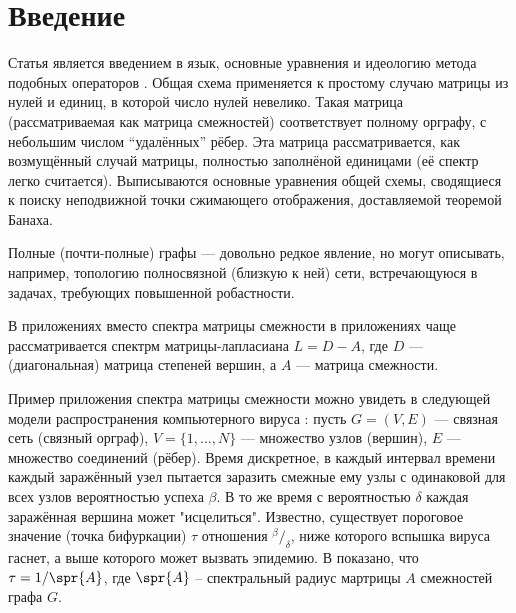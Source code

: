 \section{Введение}

Статья является введением в язык, основные уравнения и идеологию
метода подобных операторов \cite{baskakov-harmonic}.
Общая схема применяется к простому случаю матрицы из нулей и единиц,
в которой число нулей невелико.
Такая матрица (рассматриваемая как матрица смежностей)
соответствует полному орграфу, с небольшим числом ``удалённых'' рёбер.
Эта матрица рассматривается, как возмущённый случай матрицы,
полностью заполнёной единицами (её спектр легко считается).
Выписываются основные уравнения общей схемы,
сводящиеся к поиску неподвижной точки сжимающего отображения,
доставляемой теоремой Банаха.

Полные (почти-полные) графы --- довольно редкое явление,
но могут описывать, например, топологию полносвязной (близкую к ней) сети,
встречающуюся в задачах, требующих повышенной робастности.

В приложениях вместо спектра матрицы смежности в приложениях чаще рассматривается
спектрм матрицы-лапласиана \( L = D - A \),
где \( D \) --- (диагональная) матрица степеней вершин,
а \( A \) --- матрица смежности.

Пример приложения спектра матрицы смежности можно увидеть
в следующей модели распространения компьютерного вируса \cite{epidemic-eigenvalues}:
пусть \( G = (V, E) \) --- связная сеть (связный орграф),
\( V = \{1, \ldots, N\} \) --- множество узлов (вершин),
\( E \) --- множество соединений (рёбер).
Время дискретное, в каждый интервал времени каждый заражённый узел
пытается заразить смежные ему узлы с одинаковой для всех узлов вероятностью успеха \( \beta \).
В то же время с вероятностью \( \delta \) каждая заражённая вершина может "исцелиться".
Известно, существует пороговое значение (точка бифуркации) \( \tau \) отношения \( {^\beta}/_{\delta} \),
ниже которого вспышка вируса гаснет, а выше которого может вызвать эпидемию.
В \cite{epidemic-eigenvalues} показано, что \( \tau = 1/\spr{A} \),
где \( \spr{A} \) -- спектральный радиус мартрицы \( A \) смежностей графа \( G \).
